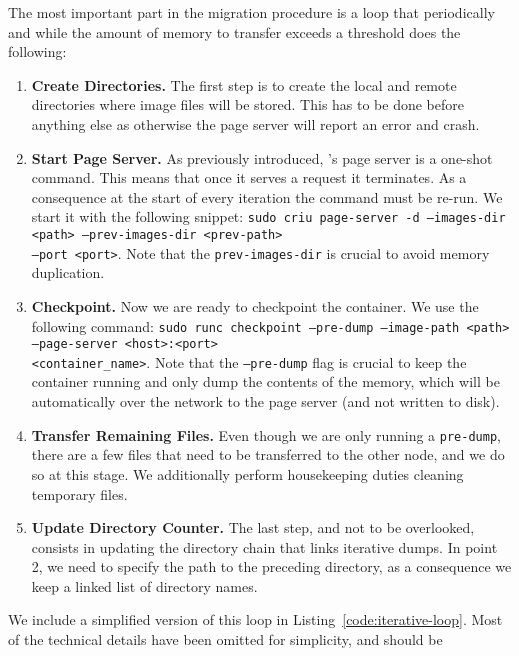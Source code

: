 The most important part in the migration procedure is a loop that periodically
and while the amount of memory to transfer exceeds a threshold does the
following:
\begin{enumerate}
    \item \textbf{Create Directories.
          }
          The first step is to create the local and remote directories where image files
          will be stored.
          This has to be done before anything else as otherwise the page server will
          report an error and crash.
    \item \textbf{Start Page Server.}
          As previously introduced, \criu's page server is a one-shot command.
          This means that once it serves a request it terminates.
          As a consequence at the start of every iteration the command must be re-run.
          We start it with the following snippet: \texttt{sudo criu page-server -d
              --images-dir <path> --prev-images-dir <prev-path>} \\\texttt{--port <port>}.
          Note that the \texttt{prev-images-dir} is crucial to avoid memory duplication.
    \item \textbf{Checkpoint.}
          Now we are ready to checkpoint the container.
          We use the following command: \texttt{sudo runc checkpoint --pre-dump
              --image-path <path> --page-server <host>:<port>} \\\texttt{<container\_name>}.
          Note that the \texttt{--pre-dump} flag is crucial to keep the container running
          and only dump the contents of the memory, which will be automatically over the
          network to the page server (and not written to disk).
    \item \textbf{Transfer Remaining Files.}
          Even though we are only running a \texttt{pre-dump}, there are a few files that
          need to be transferred to the other node, and we do so at this stage.
          We additionally perform housekeeping duties cleaning temporary files.
    \item \textbf{Update Directory Counter.}
          The last step, and not to be overlooked, consists in updating the directory
          chain that links iterative dumps.
          In point 2, we need to specify the path to the preceding directory, as a
          consequence we keep a linked list of directory names.
\end{enumerate}
We include a simplified version of this loop in
Listing~\ref{code:iterative-loop}.
Most of the technical details have been omitted for simplicity, and should be
